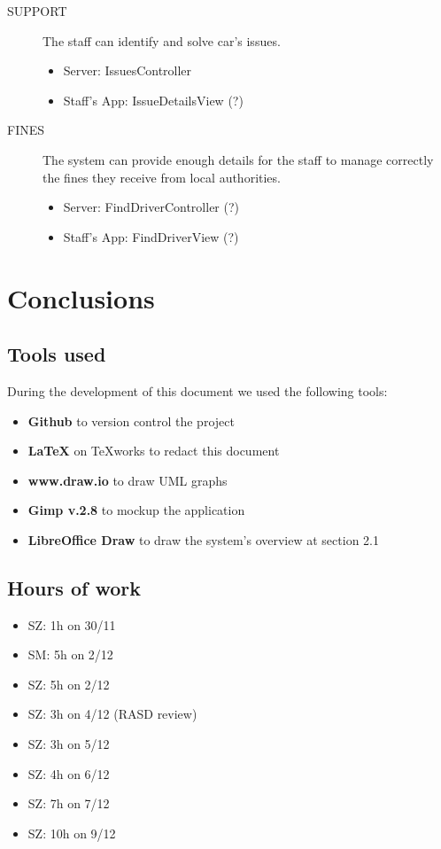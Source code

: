 \documentclass[11pt]{article} %
\begin{document}
\begin{description}
	\item[SUPPORT] The staff can identify and solve car's issues.
	\begin{itemize}
		\item Server: IssuesController
		\item Staff's App: IssueDetailsView (?)
	\end{itemize}

	\item[FINES] The system can provide enough details for the staff to manage correctly the fines they receive from local authorities.
	\begin{itemize}
		\item Server: FindDriverController (?)
		\item Staff's App: FindDriverView (?)
	\end{itemize}

 \end{description}


\newpage
\section{Conclusions}

\subsection{Tools used}
During the development of this document we used the following tools:
\begin{itemize}
	\item \textbf{Github} to version control the project
	\item \textbf{\LaTeX} on TeXworks to redact this document
	\item \textbf{www.draw.io} to draw UML graphs
	\item \textbf{Gimp v.2.8} to mockup the application
	\item \textbf{LibreOffice Draw} to draw the system's overview at section 2.1
\end{itemize}

\subsection{Hours of work}
\begin{itemize}
	\item SZ: 1h on 30/11
	\item SM: 5h on 2/12
	\item SZ: 5h on 2/12
	\item SZ: 3h on 4/12 (RASD review)
	\item SZ: 3h on 5/12
	\item SZ: 4h on 6/12
	\item SZ: 7h on 7/12
	\item SZ: 10h on 9/12 
\end{itemize}
\end{document}
